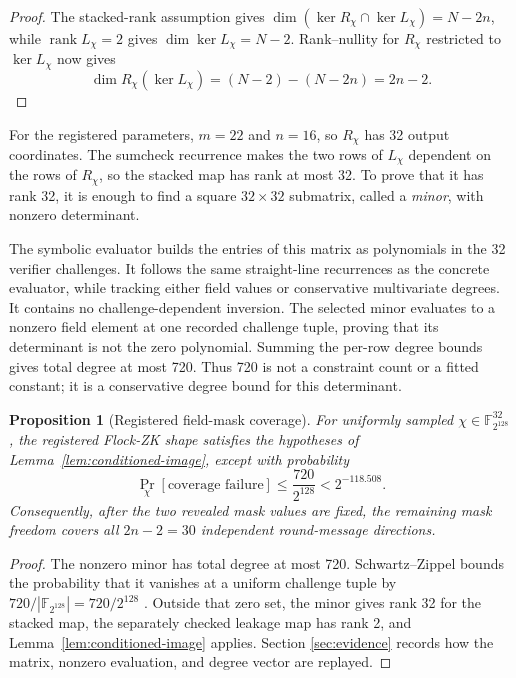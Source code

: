 \documentclass[11pt]{article}
\newtheorem{proposition}{Proposition}
\theoremstyle{definition}
\newcommand{\F}{\mathbb{F}}
\newcommand{\K}{\F_{2^{128}}}
\newcommand{\rank}{\operatorname{rank}}
\begin{document}
\begin{proof}
The stacked-rank assumption gives
$\dim(\ker R_\chi\cap\ker L_\chi)=N-2n$, while $\rank L_\chi=2$ gives
$\dim\ker L_\chi=N-2$.  Rank--nullity for $R_\chi$ restricted to
$\ker L_\chi$ now gives
\[
  \dim R_\chi(\ker L_\chi)
  =(N-2)-(N-2n)=2n-2.
\]
\end{proof}

For the registered parameters, $m=22$ and $n=16$, so $R_\chi$ has 32 output
coordinates.  The sumcheck recurrence makes the two rows of $L_\chi$
dependent on the rows of $R_\chi$, so the stacked map has rank at most 32.  To
prove that it has rank 32, it is enough to find a square $32\times32$
submatrix, called a \emph{minor}, with nonzero determinant.

The symbolic evaluator builds the entries of this matrix as polynomials in the
32 verifier challenges.  It follows the same straight-line recurrences as the
concrete evaluator, while tracking either field values or conservative
multivariate degrees.  It contains no challenge-dependent inversion.  The
selected minor evaluates to a nonzero field element at one recorded challenge
tuple, proving that its determinant is not the zero polynomial.  Summing the
per-row degree bounds gives total degree at most 720.  Thus 720 is not a
constraint count or a fitted constant; it is a conservative degree bound for
this determinant.

\begin{proposition}[Registered field-mask coverage]\label{prop:coverage}
For uniformly sampled $\chi\in\K^{32}$, the registered Flock-ZK shape satisfies
the hypotheses of Lemma~\ref{lem:conditioned-image}, except with probability
\[
  \Pr_\chi[\text{coverage failure}]
  \le \frac{720}{2^{128}}
  <2^{-118.508}.
\]
Consequently, after the two revealed mask values are fixed, the remaining
mask freedom covers all $2n-2=30$ independent round-message directions.
\end{proposition}

\begin{proof}
The nonzero minor has total degree at most 720.  Schwartz--Zippel bounds the
probability that it vanishes at a uniform challenge tuple by
$720/|\K|=720/2^{128}$ \cite{Schwartz,Zippel}.  Outside that zero set, the
minor gives rank 32 for the stacked map, the separately checked leakage map has
rank 2, and Lemma~\ref{lem:conditioned-image} applies.  Section
\ref{sec:evidence} records how the matrix, nonzero evaluation, and degree
vector are replayed.
\end{proof}
\end{document}

